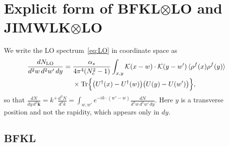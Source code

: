 \section{Explicit form of BFKL\texorpdfstring{$\otimes$}{x}LO and JIMWLK\texorpdfstring{$\otimes$}{x}LO}\label{app:explicit}

We write the LO spectrum~\eqref{eq:LO} in coordinate space as
\begin{align}
\frac{dN_{\rm LO}}{d^2w\,d^2w'\,dy}={}&\frac{\alpha_s}{4\pi^4(N_c^2-1)}\int_{x,y}\mathcal{K}(x-w)\cdot\mathcal{K}(y-w')\,\langle\rho^f(x)\rho^f(y)\rangle\notag\\
&\times\mathrm{Tr}\Big\{\big(U^{\dagger}(x)-U^{\dagger}(w)\big)\big(U(y)-U(w')\big)\Big\},
\label{eq:LOx}
\end{align}
so that $\frac{dN}{dy\,d^2\mathbf k}=k^+\frac{d^3N}{d^3k}=\int_{w,w'}e^{-ik\cdot(w'-w)}\frac{dN}{d^2w\,d^2w'\,dy}$. Here $y$ is a transverse position and not the rapidity, which appears only in $dy$.

\subsection{BFKL}

